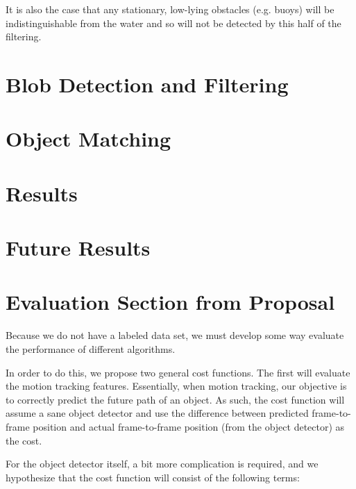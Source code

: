 \documentclass{article}
\begin{document}
It is also the case that any stationary, low-lying obstacles (e.g. buoys)
will be indistinguishable from the water and so will not be detected
by this half of the filtering.

\section{Blob Detection and Filtering}

\section{Object Matching}

\section{Results}

\section{Future Results}

\section{Evaluation Section from Proposal}

Because we do not have a labeled data set, we must develop
some way evaluate the performance of different algorithms.

In order to do this, we propose two general cost functions.
The first will evaluate the motion tracking features.
Essentially, when motion tracking, our objective is to
correctly predict the future path of an object. As such,
the cost function will assume a sane object detector and
use the difference between predicted frame-to-frame position
and actual frame-to-frame position (from the object detector)
as the cost.

For the object detector itself, a bit more complication is
required, and we hypothesize that the cost function will
consist of the following terms:
\end{document}
